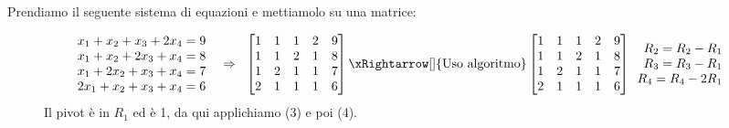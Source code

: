 \begin{example}
Prendiamo il seguente sistema di equazioni e mettiamolo su una matrice:
\end{example}
\begin{figure}[h!]
    \vspace{-20pt}
    \centering
    \begin{minipage}{1\linewidth}
        \centering
        \[
            \begin{array}{l}
            x_1 + x_2 + x_3 + 2x_4 = 9\\
            x_1 + x_2 + 2x_3 + x_4 = 8\\
            x_1 + 2x_2 + x_3 + x_4 = 7\\
            2x_1 + x_2 + x_3 + x_4 = 6
            \end{array}
            \hspace{.2cm}
            \Rightarrow
            \hspace{.2cm}
            \begin{bmatrix}
            1 & 1 & 1 & 2 & 9\\
            1 & 1 & 2 & 1 & 8\\
            1 & 2 & 1 & 1 & 7\\
            2 & 1 & 1 & 1 & 6
            \end{bmatrix}
            \xRightarrow[]{\text{Uso algoritmo}}
            \begin{bmatrix}
            1 & 1 & 1 & 2 & 9\\
            1 & 1 & 2 & 1 & 8\\
            1 & 2 & 1 & 1 & 7\\
            2 & 1 & 1 & 1 & 6
            \end{bmatrix}
            \begin{array}{r}
            R_2 = R_2 - R_1\\
            R_3 = R_3 - R_1\\
            R_4 = R_4 - 2R_1
            \end{array}
        \]
        Il pivot è in $R_1$ ed è 1, da qui applichiamo (3) e poi (4).
    \end{minipage}
\end{figure}
\vspace{-15pt}
